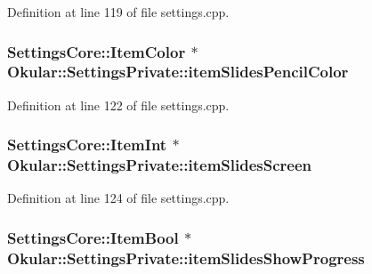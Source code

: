 Definition at line 119 of file settings.\+cpp.

\hypertarget{classOkular_1_1SettingsPrivate_a4d6faac7ea37d6afa709d3e4ed5f28b0}{
\subsubsection[{item\+Slides\+Pencil\+Color}]{\setlength{\rightskip}{0pt plus 5cm}Settings\+Core\+::\+Item\+Color $\ast$ Okular\+::\+Settings\+Private\+::item\+Slides\+Pencil\+Color}}\label{classOkular_1_1SettingsPrivate_a4d6faac7ea37d6afa709d3e4ed5f28b0}


Definition at line 122 of file settings.\+cpp.

\hypertarget{classOkular_1_1SettingsPrivate_af4950dce8d281ec9e8531fed303d3851}{
\subsubsection[{item\+Slides\+Screen}]{\setlength{\rightskip}{0pt plus 5cm}Settings\+Core\+::\+Item\+Int $\ast$ Okular\+::\+Settings\+Private\+::item\+Slides\+Screen}}\label{classOkular_1_1SettingsPrivate_af4950dce8d281ec9e8531fed303d3851}


Definition at line 124 of file settings.\+cpp.

\hypertarget{classOkular_1_1SettingsPrivate_aa017e69102f9826cab17015728a06d0e}{
\subsubsection[{item\+Slides\+Show\+Progress}]{\setlength{\rightskip}{0pt plus 5cm}Settings\+Core\+::\+Item\+Bool $\ast$ Okular\+::\+Settings\+Private\+::item\+Slides\+Show\+Progress}}\label{classOkular_1_1SettingsPrivate_aa017e69102f9826cab17015728a06d0e}


